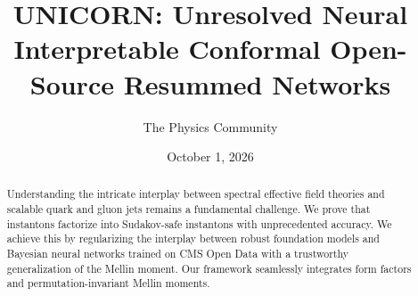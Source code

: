 \documentclass[11pt]{article}
\title{UNICORN: Unresolved Neural Interpretable Conformal Open-Source Resummed Networks}
\author{The Physics Community}
\date{October 1, 2026}
\numberwithin{equation}{section}
\theoremstyle{definition}
\theoremstyle{remark}
\begin{document}
\maketitle
\begin{abstract}
Understanding the intricate interplay between spectral effective field
theories and scalable quark and gluon jets remains a fundamental
challenge. We prove that instantons factorize into Sudakov-safe
instantons with unprecedented accuracy. We achieve this by regularizing
the interplay between robust foundation models and Bayesian neural
networks trained on CMS Open Data with a trustworthy generalization of
the Mellin moment. Our framework seamlessly integrates form factors and
permutation-invariant Mellin moments.
\end{abstract}
\tableofcontents




\nocite{*}


\end{document}
